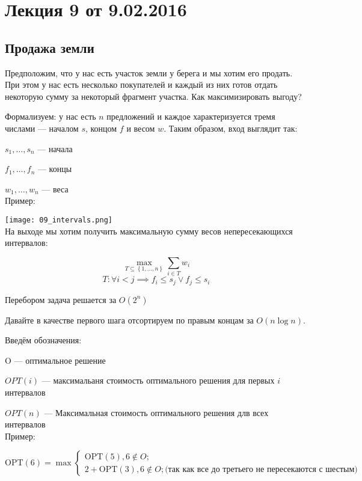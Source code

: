 



\section*{Лекция 9 от 9.02.2016}

\subsection{Продажа земли}

Предположим, что у нас есть участок земли у берега и мы хотим его продать.
При этом у нас есть несколько покупателей и каждый из них готов отдать некоторую сумму за некоторый фрагмент участка.
Как максимизировать выгоду?

Формализуем: у нас есть $n$ предложений и каждое характеризуется тремя числами — началом $s$, концом $f$ и весом $w$.
Таким образом, вход выглядит так:

$s_1, \ldots, s_n$ --- начала

$f_1, \ldots, f_n$ --- концы

$w_1, \ldots, w_n$ --- веса\\

Пример:

\texttt{[image: 09\_intervals.png]}\\

На выходе мы хотим получить максимальную сумму весов непересекающихся интервалов:

\[
\max\limits_{T\subseteq \left\{ 1,\ldots, n \right\}} \sum\limits_{i\in T}w_i 
\]
\[
T: \forall i<j \implies f_i \leqslant s_j \lor f_j \leqslant s_i
\]

Перебором задача решается за $O(2^n)$

Давайте в качестве первого шага отсортируем по правым концам за $O(n\log n)$.

Введём обозначения:

O --- оптимальное решение

$OPT(i)$ — максимальаня стоимость оптимального решения для первых $i$ интервалов

$OPT(n)$ — Максимальная стоимость оптимального решения длв всех интервалов\\

Пример:

\[
    \mathrm{OPT}(6) = \max\begin{cases}
        \mathrm{OPT}(5), 6\not\in O;\\
        2+ \mathrm{OPT}(3), 6\not\in O; \text{(так как все до третьего не пересекаются с шестым)}
    \end{cases}
\]

